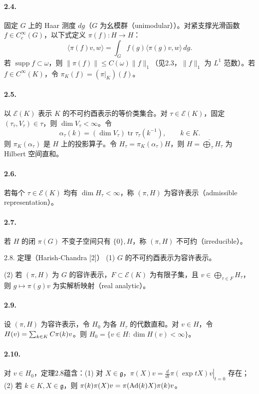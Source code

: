 \paragraph*{2.4.} 固定 $G$ 上的 Haar 测度 $dg$（$G$ 为幺模群（unimodular））。对紧支撑光滑函数 $f\in C_c^\infty(G)$，以下式定义 $\pi(f):H\to H$：
\[
 \langle\pi(f)v,w\rangle=\int_Gf(g)\langle\pi(g)v,w\rangle\,dg.
\]
若 $\operatorname{supp}f\subset\omega$，则 $\|\pi(f)\|\le C(\omega)\|f\|_1$（见2.3，$\|f\|_1$ 为 $L^1$ 范数）。若 $f\in C^\infty(K)$，令 $\pi_K(f)=(\pi|_K)(f)$。
\paragraph*{2.5.} 以 $\mathcal E(K)$ 表示 $K$ 的不可约酉表示的等价类集合。对 $\tau\in\mathcal E(K)$，固定 $(\tau_\tau,V_\tau)\in\tau$，则 $\dim V_\tau<\infty$。令
\[
 \alpha_\tau(k)=(\dim V_\tau)\operatorname{tr}\tau_\tau(k^{-1}),\qquad k\in K.
\]
则 $\pi_K(\alpha_\tau)$ 是 $H$ 上的投影算子。令 $H_\tau=\pi_K(\alpha_\tau)H$，则 $H=\widehat{\bigoplus}_\tau H_\tau$ 为 Hilbert 空间直和。
\paragraph*{2.6.} 若每个 $\tau\in\mathcal E(K)$ 均有 $\dim H_\tau<\infty$，称 $(\pi,H)$ 为容许表示（admissible representation）。
\paragraph*{2.7.} 若 $H$ 的闭 $\pi(G)$ 不变子空间只有 $\{0\},H$，称 $(\pi,H)$ 不可约（irreducible）。
\begin{originaltheorem}{2.8. 定理（Harish-Chandra [2]）}
(1) $G$ 的不可约酉表示为容许表示。

(2) 若 $(\pi,H)$ 为 $G$ 的容许表示，$F\subset\mathcal E(K)$ 为有限子集，且 $v\in\bigoplus_{\tau\in F}H_\tau$，则 $g\mapsto\pi(g)v$ 为实解析映射（real analytic）。
\end{originaltheorem}
\paragraph*{2.9.} 设 $(\pi,H)$ 为容许表示，令 $H_0$ 为各 $H_\tau$ 的代数直和。对 $v\in H$，令 $H(v)=\sum_{k\in K}C\pi(k)v$。则 $H_0=\{v\in H:\dim H(v)<\infty\}$。
\paragraph*{2.10.} 对 $v\in H_0$，定理2.8蕴含：(1) 对 $X\in\mathfrak g$，$\pi(X)v=\left.\frac d{dt}\pi(\exp tX)v\right|_{t=0}$ 存在；(2) 若 $k\in K,X\in\mathfrak g$，则 $\pi(k)\pi(X)v=\pi(\operatorname{Ad}(k)X)\pi(k)v$。
